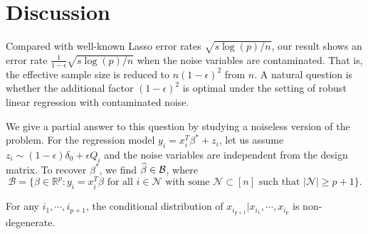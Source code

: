 
\def\ones{{\mathds{1}}}

\section{Discussion}
\label{sec:discuss}


Compared with well-known Lasso error rates \citep{bickel2009simultaneous} $\sqrt{{s\log(p)}/{n}}$, our result shows an error rate $\frac{1}{1-\epsilon}\sqrt{{s\log(p)}/{n}}$ when the noise variables are contaminated. That is, the effective sample size is reduced to $n(1-\epsilon)^2$ from $n$. A natural question is whether the additional factor $(1-\epsilon)^2$ is optimal under the setting of robust linear regression with contaminated noise.

We give a partial answer to this question by studying a noiseless version of the problem. For the regression model $y_i=x_i^T\beta^*+z_i$, let us assume $z_i\sim (1-\epsilon)\delta_0 +\epsilon Q_i$ and the noise variables are independent from the design matrix. To recover $\beta^*$, we find $\widehat{\beta}\in\mathcal{B}$, where
$$\mathcal{B}=\{\beta\in\mathbb{R}^p: y_i=x_i^T\beta\text{ for all }i\in\mathcal{N}\text{ with some }\mathcal{N}\subset[n]\text{ such that }|\mathcal{N}|\geq p+1\}.$$

\begin{condd}
For any $i_1,\cdots,i_{p+1}$, the conditional distribution of $x_{i_{p+1}}|x_{i_1},\cdots,x_{i_{p}}$ is non-degenerate.
\end{condd}

